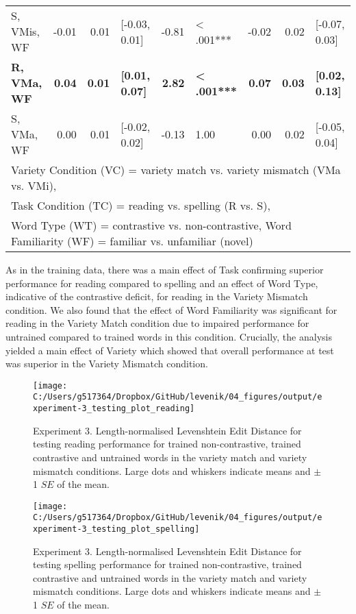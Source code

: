 \documentclass[doc,floatsintext]{apa6}
\begin{document}
\begin{table}[!h]
{\begin{tabular}{lrrlrlrrl}
S, VMis, WF & -0.01 & 0.01 & [-0.03, 0.01] & -0.81 & < .001*** & -0.02 & 0.02 & [-0.07, 0.03]\\
\textbf{R, VMa, WF} & \textbf{0.04} & \textbf{0.01} & \textbf{[0.01, 0.07]} & \textbf{2.82} & \textbf{< .001***} & \textbf{0.07} & \textbf{0.03} & \textbf{[0.02, 0.13]}\\
S, VMa, WF & 0.00 & 0.01 & [-0.02, 0.02] & -0.13 & 1.00 & 0.00 & 0.02 & [-0.05, 0.04]\\
\bottomrule
\multicolumn{9}{l}{Variety Condition (VC) = variety match vs. variety mismatch (VMa vs. VMi),}\\
\multicolumn{9}{l}{Task Condition (TC) = reading vs. spelling (R vs. S),}\\
\multicolumn{9}{l}{Word Type (WT) = contrastive vs. non-contrastive, Word Familiarity (WF) = familiar vs. unfamiliar (novel)}\\
\end{tabular}}
\end{table}

As in the training data, there was a main effect of Task confirming
superior performance for reading compared to spelling and an effect of
Word Type, indicative of the contrastive deficit, for reading in the
Variety Mismatch condition. We also found that the effect of Word
Familiarity was significant for reading in the Variety Match condition
due to impaired performance for untrained compared to trained words in
this condition. Crucially, the analysis yielded a main effect of Variety
which showed that overall performance at test was superior in the
Variety Mismatch condition.

\begin{figure}[htb]

{\centering \texttt{[image: C:/Users/g517364/Dropbox/GitHub/levenik/04\_figures/output/experiment-3\_testing\_plot\_reading]} 

}

\caption{Experiment 3. Length-normalised Levenshtein Edit Distance for testing reading performance for trained non-contrastive, trained contrastive and untrained words in the variety match and variety mismatch conditions. Large dots and whiskers indicate means and $\pm$ 1 $SE$ of the mean.}\label{fig:ex3-test-reading-plots}
\end{figure}

\begin{figure}[htb]

{\centering \texttt{[image: C:/Users/g517364/Dropbox/GitHub/levenik/04\_figures/output/experiment-3\_testing\_plot\_spelling]} 

}

\caption{Experiment 3. Length-normalised Levenshtein Edit Distance for testing spelling performance for trained non-contrastive, trained contrastive and untrained words in the variety match and variety mismatch conditions. Large dots and whiskers indicate means and $\pm$ 1 $SE$ of the mean.}\label{fig:ex3-test-spelling-plots}
\end{figure}
\end{document}
